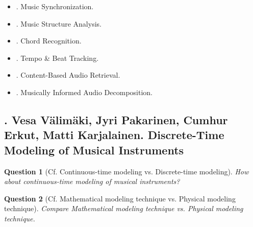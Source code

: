 \documentclass{article}
\newtheorem{question}{Question}
\begin{document}
\begin{itemize}
\begin{itemize}
\begin{itemize}
			Regarding 2nd problem, one computes Fourier transform only for a finite number of frequencies. Similar to sampling of time axis, one typically samples frequency axis by considering frequencies $\omega = \frac{k}{M}$ for some suitable $M\in\mathbb{N}$ \& $k\in[0:M-1]$. In practice, one often couples number $N$ of samples \& number $M$ that determines frequency resolution by setting $N = M$. Note: 2 numbers $N,M$ refer to different aspects. However, coupling is convenient. p 52+++
			
		\end{itemize}
	\end{itemize}
	\item {. Music Synchronization.}
	\item {. Music Structure Analysis.}
	\item {. Chord Recognition.}
	\item {. Tempo \& Beat Tracking.}
	\item {. Content-Based Audio Retrieval.}
	\item {. Musically Informed Audio Decomposition.} 
\end{itemize}


\subsection{\cite{Valimaki_Pakarinen_Erkut_Karjalainen2006}. {\sc Vesa Välimäki, Jyri Pakarinen, Cumhur Erkut, Matti Karjalainen}. Discrete-Time Modeling of Musical Instruments}
{\sf[283 citations]}
\begin{question}[Cf. Continuous-time modeling vs. Discrete-time modeling]
	How about continuous-time modeling of musical instruments?
\end{question}

\begin{question}[Cf. Mathematical modeling technique vs. Physical modeling technique]
	Compare Mathematical modeling technique vs. Physical modeling technique.
\end{question}
\end{document}
